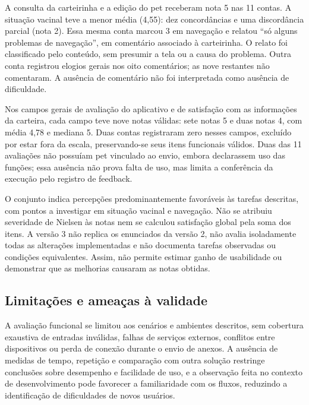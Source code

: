 \documentclass{UNESC}
\begin{document}
A consulta da carteirinha e a edição do pet receberam nota 5 nas 11 contas. A situação vacinal teve a menor média (4,55): dez concordâncias e uma discordância parcial (nota 2). Essa mesma conta marcou 3 em navegação e relatou ``só alguns problemas de navegação'', em comentário associado à carteirinha. O relato foi classificado pelo conteúdo, sem presumir a tela ou a causa do problema. Outra conta registrou elogios gerais nos oito comentários; as nove restantes não comentaram. A ausência de comentário não foi interpretada como ausência de dificuldade.

Nos campos gerais de avaliação do aplicativo e de satisfação com as informações da carteira, cada campo teve nove notas válidas: sete notas 5 e duas notas 4, com média 4,78 e mediana 5. Duas contas registraram zero nesses campos, excluído por estar fora da escala, preservando-se seus itens funcionais válidos. Duas das 11 avaliações não possuíam pet vinculado ao envio, embora declarassem uso das funções; essa ausência não prova falta de uso, mas limita a conferência da execução pelo registro de feedback.

O conjunto indica percepções predominantemente favoráveis às tarefas descritas, com pontos a investigar em situação vacinal e navegação. Não se atribuiu severidade de Nielsen às notas nem se calculou satisfação global pela soma dos itens. A versão 3 não replica os enunciados da versão 2, não avalia isoladamente todas as alterações implementadas e não documenta tarefas observadas ou condições equivalentes. Assim, não permite estimar ganho de usabilidade ou demonstrar que as melhorias causaram as notas obtidas.

\subsection{Limitações e ameaças à validade}

A avaliação funcional se limitou aos cenários e ambientes descritos, sem cobertura exaustiva de entradas inválidas, falhas de serviços externos, conflitos entre dispositivos ou perda de conexão durante o envio de anexos. A ausência de medidas de tempo, repetição e comparação com outra solução restringe conclusões sobre desempenho e facilidade de uso, e a observação feita no contexto de desenvolvimento pode favorecer a familiaridade com os fluxos, reduzindo a identificação de dificuldades de novos usuários.
\end{document}
